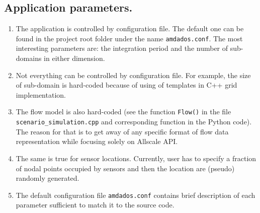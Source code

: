 \documentclass[]{article}
\begin{document}
\subsection{Application parameters.}
\begin{enumerate}
\item The application is controlled by configuration file. The default one can be found in the project root folder under the name \texttt{amdados.conf}. The most interesting parameters are: the integration period and the number of sub-domains in either dimension. 
\item Not everything can be controlled by configuration file. For example, the size of sub-domain is hard-coded because of using of templates in C++ grid implementation.
\item The flow model is also hard-coded (see the function \texttt{Flow()} in the file \texttt{scenario\_simulation.cpp} and corresponding function in the Python code). The reason for that is to get away of any specific format of flow data representation while focusing solely on Allscale API.
\item The same is true for sensor locations. Currently, user has to specify a fraction of nodal points occupied by sensors and then the location are (pseudo) randomly generated.
\item The default configuration file \texttt{amdados.conf} contains brief description of each parameter sufficient to match it to the source code.
\end{enumerate}

\end{document}
